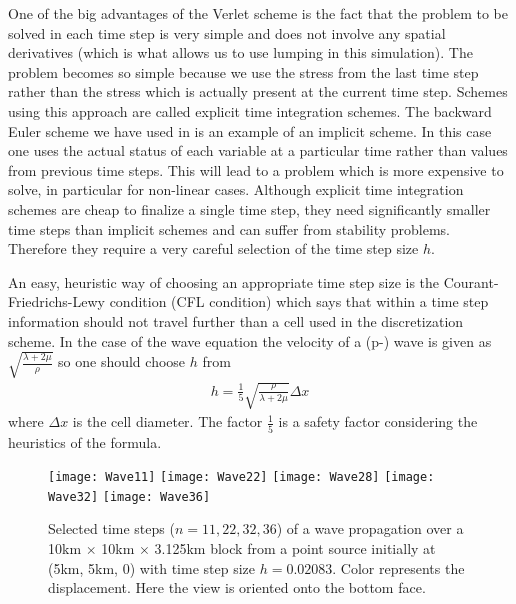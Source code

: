 One of the big advantages of the Verlet scheme is the fact that the problem to
be solved in each time step is very simple and does not involve any spatial
derivatives (which is what allows us to use lumping in this simulation).
The problem becomes so simple because we use the stress from the last time
step rather than the stress which is actually present at the current time step.
Schemes using this approach are called explicit time integration schemes.
The backward Euler scheme we have used in  is an example
of an implicit scheme.
In this case one uses the actual status of each variable at a particular time
rather than values from previous time steps.
This will lead to a problem which is more expensive to solve, in particular
for non-linear cases.
Although explicit time integration schemes are cheap to finalize a single time
step, they need significantly smaller time steps than implicit schemes and can
suffer from stability problems.
Therefore they require a very careful selection of the time step size $h$.

An easy, heuristic way of choosing an appropriate time step size is the
Courant-Friedrichs-Lewy condition (CFL condition)
which says that within a time step information should not travel further than
a cell used in the discretization scheme.
In the case of the wave equation the velocity of a (p-) wave is given as
$\sqrt{\frac{\lambda+2\mu}{\rho}}$ so one should choose $h$ from
\begin{eqnarray}\label{WAVE dyn 66}
h= \frac{1}{5} \sqrt{\frac{\rho}{\lambda+2\mu}} \Delta x
\end{eqnarray}
where $\Delta x$ is the cell diameter.
The factor $\frac{1}{5}$ is a safety factor considering the heuristics of the formula. 

\begin{figure}[t]
\begin{center}
\texttt{[image: Wave11]}
\texttt{[image: Wave22]}
\texttt{[image: Wave28]}
\texttt{[image: Wave32]}
\texttt{[image: Wave36]}
\end{center}
\caption{Selected time steps ($n = 11, 22, 32, 36$) of a wave propagation over
a 10km $\times$ 10km $\times$ 3.125km block from a point source initially at
(5km, 5km, 0) with time step size $h=0.02083$. Color represents the
displacement. Here the view is oriented onto the bottom face.
\label{WAVE FIG 2}}
\end{figure}

